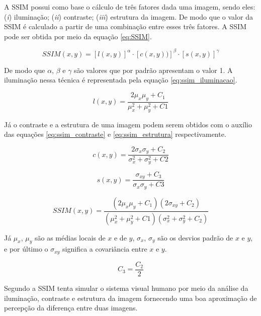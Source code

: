 A SSIM possui como base o cálculo de três fatores dada uma imagem, sendo eles: (\textit{i}) iluminação; (\textit{ii}) contraste; (\textit{iii}) estrutura da imagem. De modo que o valor da SSIM é calculado a partir de uma combinação entre esses três fatores. A SSIM pode ser obtida por meio da equação \ref{eq:SSIM}. 

\begin{equation}
\label{eq:SSIM}
SSIM(x,y)=[l(x,y)]^\alpha \cdot[c(x,y))]^\beta \cdot [s(x,y)]^\gamma
\end{equation}

De modo que $\alpha$, $\beta$ e $\gamma$ são valores que por padrão apresentam o valor 1. A iluminação nessa técnica é representada pela equação \ref{eq:ssim_iluminacao}. 

\begin{equation}
l(x,y) = \frac{2\mu_x \mu_y + C_1}{\mu_x^2 + \mu_y^2 + C1}
\label{eq:ssim_iluminacao}
\end{equation}

Já o contraste e a estrutura de uma imagem podem serem obtidos com o auxílio das equações \ref{eq:ssim_contraste} e \ref{eq:ssim_estrutura} respectivamente.

\begin{equation}
c(x,y) = \frac{2\sigma_x \sigma_y + C_2}{\sigma_x^2 + \sigma_y^2 + C2}
\label{eq:ssim_contraste}
\end{equation}



\begin{equation}
s(x,y) = \frac{\sigma_{xy} + C_3}{\sigma_x\sigma_y + C3}
\label{eq:ssim_estrutura}
\end{equation}

\begin{equation}
SSIM(x,y) = \frac{(2\mu_x\mu_y + C_1) (2\sigma_{xy} +C_2)}{(\mu_x^2 + \mu_y^2 + C1) (\sigma_x^2 + \sigma_y^2 + C_2)}
\end{equation}

Já $\mu_x$, $\mu_y$ são as médias locais de $x$ e de $y$, $\sigma_x$, $\sigma_y$ são os desvios padrão de $x$ e $y$, e por último o $\sigma_{xy}$ significa a covariância entre $x$ e $y$.


\begin{equation}
C_3 = \frac{C_2}{2}
\end{equation}

Segundo  a SSIM tenta simular o sistema visual humano por meio da análise da iluminação, contraste e estrutura da imagem fornecendo uma boa aproximação de percepção da diferença entre duas imagens.


